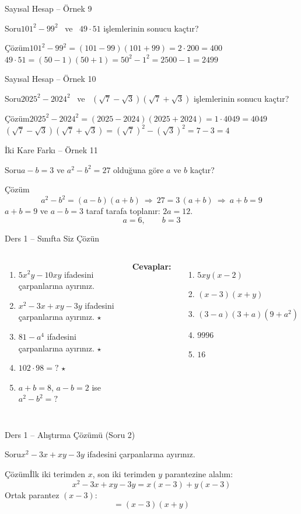 \documentclass[aspectratio=169,11pt]{beamer}
\newcommand{\soru}[3]{%
\begin{frame}{#1}
  \begin{block}{Soru}\large #2\end{block}
  \pause
  \begin{exampleblock}{Çözüm}\large #3\end{exampleblock}
\end{frame}}
\begin{document}
\soru{Sayısal Hesap -- Örnek 9}
{\(101^2-99^2\) \ ve \ \(49\cdot 51\) işlemlerinin sonucu kaçtır?}
{\(101^2-99^2=(101-99)(101+99)=2\cdot 200=400\)\\[4pt]
\(49\cdot 51=(50-1)(50+1)=50^2-1^2=2500-1=2499\)}

\soru{Sayısal Hesap -- Örnek 10}
{\(2025^2-2024^2\) \ ve \ \((\sqrt{7}-\sqrt{3})(\sqrt{7}+\sqrt{3})\) işlemlerinin sonucu kaçtır?}
{\(2025^2-2024^2=(2025-2024)(2025+2024)=1\cdot 4049=4049\)\\[4pt]
\((\sqrt{7}-\sqrt{3})(\sqrt{7}+\sqrt{3})=(\sqrt{7})^2-(\sqrt{3})^2=7-3=4\)}

\soru{İki Kare Farkı -- Örnek 11}
{\(a-b=3\) ve \(a^2-b^2=27\) olduğuna göre \(a\) ve \(b\) kaçtır?}
{\[a^2-b^2=(a-b)(a+b)\ \Rightarrow\ 27=3\,(a+b)\ \Rightarrow\ a+b=9\]
\(a+b=9\) ve \(a-b=3\) taraf tarafa toplanır: \(2a=12\).
\[a=6,\qquad b=3\]}

\begin{frame}{Ders 1 -- Sınıfta Siz Çözün}
\begin{columns}[t]
\begin{enumerate}
\item \(5x^2y-10xy\) ifadesini çarpanlarına ayırınız.
\item \(x^2-3x+xy-3y\) ifadesini çarpanlarına ayırınız. \(\star\)
\item \(81-a^4\) ifadesini çarpanlarına ayırınız. \(\star\)
\item \(102\cdot 98=?\) \(\star\)
\item \(a+b=8\), \(a-b=2\) ise \(a^2-b^2=?\)
\end{enumerate}
\pause
\textbf{Cevaplar:}
\begin{enumerate}
\item \(5xy(x-2)\)
\item \((x-3)(x+y)\)
\item \((3-a)(3+a)(9+a^2)\)
\item \(9996\)
\item \(16\)
\end{enumerate}
\end{columns}
\vspace{4pt}{\footnotesize \(\star\) işaretli soruların adım adım çözümü sonraki slaytlardadır.}
\end{frame}

\soru{Ders 1 -- Alıştırma Çözümü (Soru 2)}
{\(x^2-3x+xy-3y\) ifadesini çarpanlarına ayırınız.}
{İlk iki terimden \(x\), son iki terimden \(y\) parantezine alalım:
\[x^2-3x+xy-3y=x(x-3)+y(x-3)\]
Ortak parantez \((x-3)\):
\[=(x-3)(x+y)\]}
\end{document}
